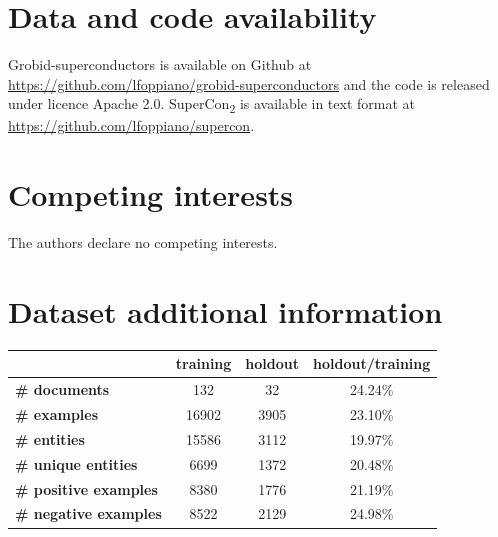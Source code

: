 \documentclass[]{interact}
\theoremstyle{plain}%
\theoremstyle{definition}
\theoremstyle{remark}
\begin{document}

\section*{Data and code availability}
Grobid-superconductors is available on Github at \url{https://github.com/lfoppiano/grobid-superconductors} and the code is released under licence Apache 2.0. 
SuperCon\textsubscript{2} is available in text format at \url{https://github.com/lfoppiano/supercon}. 


\section*{Competing interests}

The authors declare no competing interests.





\appendix

\section{Dataset additional information}

\begin{table}[ht]
    \centering
    {
        \begin{tabular}{lccc}
            \toprule
                                          & \textbf{training} & \textbf{holdout} & \textbf{holdout/training} \\
            \midrule
            \textbf{\# documents}         & 132               & 32               & 24.24\%                   \\
            \textbf{\# examples}          & 16902             & 3905             & 23.10\%                   \\
            \textbf{\# entities}          & 15586             & 3112             & 19.97\%                   \\
            \textbf{\# unique entities}   & 6699              & 1372             & 20.48\%                   \\
            \textbf{\# positive examples} & 8380              & 1776             & 21.19\%                   \\
            \textbf{\# negative examples} & 8522              & 2129             & 24.98\%                   \\
            \bottomrule
        \end{tabular}
    }
    \label{tab:training-holdout-set-distribution-annex}
\end{table}
\end{document}
